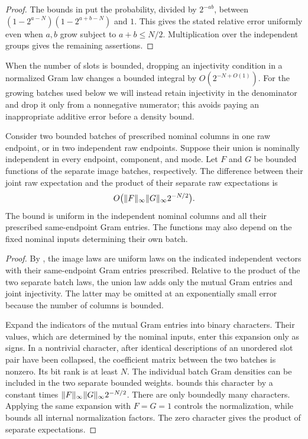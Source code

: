 \begin{proof}
The bounds in  put the
probability, divided by $2^{-ab}$, between
$(1-2^{a-N})(1-2^{a+b-N})$ and $1$. This gives the stated relative
error uniformly even when $a,b$ grow subject to $a+b\le N/2$.
Multiplication over the independent groups gives the remaining assertions.
\end{proof}

When the number of slots is bounded, dropping an injectivity condition
in a normalized Gram law changes a bounded integral by
$O(2^{-N+O(1)})$. For the growing batches used below we will instead
retain injectivity in the denominator and drop it only from a
nonnegative numerator; this avoids paying an inappropriate additive
error before a density bound.

\begin{lemma}
\label{lem:histogram-batch-comparison}
Consider two bounded batches of prescribed nominal columns in one raw
endpoint, or in two independent raw endpoints. Suppose their union is
nominally independent in every endpoint, component, and mode. Let $F$
and $G$ be bounded functions of the separate image batches, respectively.
The difference between their joint raw expectation and the product of
their separate raw expectations is
\[
 O\bigl(\lVert F\rVert_\infty\lVert G\rVert_\infty 2^{-N/2}\bigr).
\]
The bound is uniform in the independent nominal columns and all their
prescribed same-endpoint Gram entries. The functions may also depend
on the fixed nominal inputs determining their own batch.
\end{lemma}

\begin{proof}
By , the image laws are uniform laws on the
indicated independent vectors with their same-endpoint Gram entries
prescribed. Relative to the product of the two separate batch laws,
the union law adds only the mutual Gram entries and joint injectivity.
The latter may be omitted at an exponentially small error because the
number of columns is bounded.

Expand the indicators of the mutual Gram entries into binary
characters. Their values, which are determined by the nominal inputs,
enter this expansion only as signs. In a nontrivial character, after
identical descriptions of an unordered slot pair have been collapsed,
the coefficient matrix between the two batches is nonzero. Its bit
rank is at least $N$. The individual batch Gram densities can be
included in the two separate bounded weights.  bounds
this character by a constant times
$\lVert F\rVert_\infty\lVert G\rVert_\infty2^{-N/2}$.
There are only boundedly many characters. Applying the same expansion
with $F=G=1$ controls the normalization, while
 bounds all internal normalization
factors. The zero character gives the product of separate expectations.
\end{proof}

